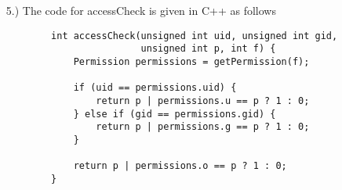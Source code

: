 \documentclass[11pt]{article}
\begin{document}
\begin{itemize}
    \item [5.)] The code for accessCheck is given in C++ as follows
    \begin{verbatim}
        int accessCheck(unsigned int uid, unsigned int gid,
                        unsigned int p, int f) {
            Permission permissions = getPermission(f);

            if (uid == permissions.uid) {
                return p | permissions.u == p ? 1 : 0;
            } else if (gid == permissions.gid) {
                return p | permissions.g == p ? 1 : 0;
            }

            return p | permissions.o == p ? 1 : 0;
        }
    \end{verbatim}
\end{itemize}
\end{document}
